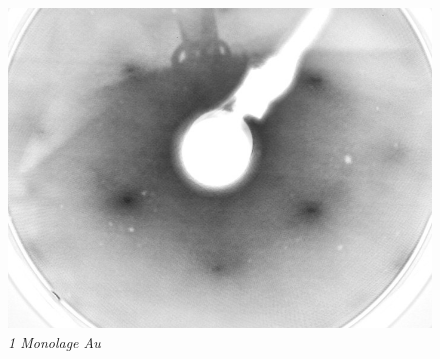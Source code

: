 \documentclass{beamer}
\begin{document}
\begin{frame}
\begin{minipage}{\linewidth}
\begin{figure}[H]
\begin{minipage}[b]{0.3\textwidth}
		\label{1/2ML} 
	\end{minipage}
	\hfill
	\begin{minipage}[b]{0.3\textwidth} 
		\includegraphics[width=\textwidth]{bilder/1ML_E207}
		\caption*{\textit{1 Monolage Au}}
		\label{1ML} 
	\end{minipage}
	

\end{figure}
\end{minipage}
\end{frame}
\end{document}
